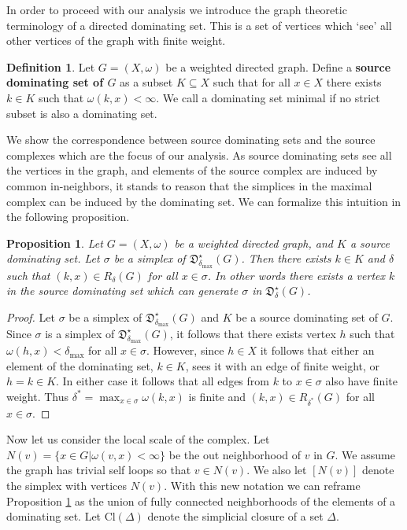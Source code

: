 \documentclass[pdflatex,bst/sn-mathphys-num]{sn-jnl}%
\theoremstyle{thmstyleone}%
\newtheorem{prop}[theorem]{Proposition}%
\theoremstyle{definition}
\theoremstyle{thmstyletwo}%
\newcommand{\FD}{\mathfrak{D}}
\theoremstyle{thmstylethree}%
\newtheorem{definition}{Definition}%
\begin{document}
In order to proceed with our analysis we introduce the graph theoretic terminology of a directed dominating set. This is a set of vertices which `see' all other vertices of the graph with finite weight. 
\begin{definition}
    Let $G=(X,\omega)$ be a weighted directed graph. 
    Define a \textbf{source dominating set of $G$} as a subset $K\subseteq X$ such that for all $x\in X$ there exists $k\in K$ such that $\omega(k,x)<\infty$.
    We call a dominating set minimal if no strict subset is also a dominating set.
\end{definition}

We show the correspondence between source dominating sets and the source complexes which are the focus of our analysis. As source dominating sets see all the vertices in the graph, and elements of the source complex are induced by common in-neighbors, it stands to reason that the simplices in the maximal complex can be induced by the dominating set. We can formalize this intuition in the following proposition.


\begin{prop}\label{so_dom_set_simplex}
    Let $G=(X,\omega)$ be a weighted directed graph, and $K$ a source dominating set. Let $\sigma$ be a simplex of $\FD^\star_{\delta_\text{max}}(G)$. Then there exists $k\in K$ and $\delta$ such that $(k,x)\in R_\delta(G)$ for all $x\in \sigma$. In other words there exists a vertex $k$ in the source dominating set which can generate $\sigma$ in $\FD^\star_{\delta}(G)$.
\end{prop}
\begin{proof}
Let $\sigma$ be a simplex of $\FD^\star_{\delta_\text{max}}(G)$ and $K$ be a source dominating set of $G$. Since $\sigma$ is a simplex of $\FD^\star_{\delta_\text{max}}(G)$, it follows that there exists vertex $h$ such that $\omega(h,x)<\delta_{\text{max}}$ for all $x\in \sigma$. However, since $h\in X$ it follows that either an element of the dominating set, $k\in K$, sees it with an edge of finite weight, or $h=k\in K$. In either case it follows that all edges from $k$ to $x\in \sigma$ also have finite weight. Thus $\delta^* = \max_{x\in \sigma} \omega(k,x)$ is finite and $(k,x) \in R_{\delta^*}(G)$ for all $x\in \sigma$.
\end{proof}

Now let us consider the local scale of the complex. Let $N(v)=\{x\in G | \omega(v,x)<\infty\}$ be the out neighborhood of $v$ in $G$. We assume the graph has trivial self loops so that $v\in N(v)$. We also let $[N(v)]$ denote the simplex with vertices $N(v)$. With this new notation we can reframe Proposition \ref{so_dom_set_simplex} as the union of fully connected neighborhoods of the elements of a dominating set. Let Cl$(\Delta)$ denote the simplicial closure of a set $\Delta$.
\end{document}
